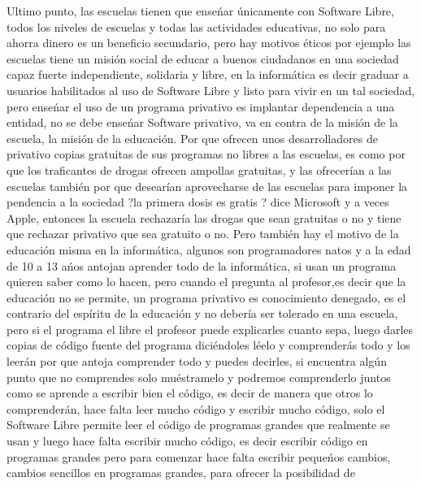 \begin{multicols}{2}
Ultimo punto, las escuelas tienen que  enseńar únicamente con Software Libre, todos los niveles de escuelas y todas las actividades educativas, no solo para ahorra dinero es un beneficio secundario, pero hay motivos éticos por ejemplo las escuelas tiene un misión social de educar a buenos ciudadanos en una sociedad capaz fuerte independiente, solidaria y libre, en la informática es decir graduar a usuarios habilitados al uso de Software Libre y listo para vivir en un tal sociedad, pero enseńar el uso de un programa privativo es implantar dependencia a una entidad, no se debe enseńar Software privativo, va en contra de la misión de la escuela, la misión de la educación. Por que ofrecen unos desarrolladores de privativo copias gratuitas de sus programas no libres a las escuelas, es como por que los traficantes de drogas ofrecen ampollas gratuitas, y las ofrecerían a las escuelas también por que desearían aprovecharse de las escuelas para imponer la pendencia a la sociedad ?la primera dosis es gratis ?  dice Microsoft y a veces Apple, entonces la escuela rechazaría las drogas que sean gratuitas o no y tiene que rechazar privativo que sea gratuito o no. Pero también hay el motivo de la educación misma en la informática, algunos son programadores natos y a la edad de 10 a 13 ańos antojan aprender todo de la informática, si usan un programa quieren saber como lo hacen, pero cuando el pregunta al profesor,{\em {\color{introcolor}{ si el programa es privativo, solo puede contestarles es un secreto no podemos saberlo, }}}es decir que la educación no se permite, un programa privativo es conocimiento denegado, es el contrario del espíritu de la educación y no debería ser tolerado en una escuela, pero si el programa el libre el profesor puede explicarles cuanto sepa, luego darles copias de código fuente del programa diciéndoles léelo y comprenderás todo y los leerán por que antoja comprender todo y puedes decirles, si encuentra algún punto que no comprendes solo muéstramelo y podremos comprenderlo juntos como se aprende a escribir bien el código, es decir de manera que otros lo comprenderán, hace falta leer mucho código y escribir mucho código, solo el Software Libre permite leer el código de programas grandes que realmente se usan y luego hace falta escribir mucho código, es decir escribir código en programas grandes  pero para comenzar hace falta escribir pequeńos cambios, cambios sencillos en programas grandes, para ofrecer la posibilidad de



\end{multicols}
